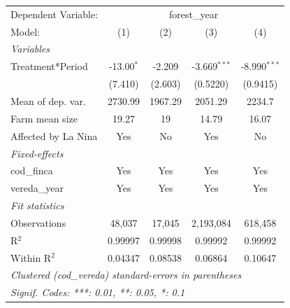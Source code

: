 
\begingroup
\centering
\begin{tabular}{lcccc}
   \tabularnewline \midrule \midrule
   Dependent Variable: & \multicolumn{4}{c}{forest\_year}\\
   Model:              & (1)          & (2)     & (3)            & (4)\\  
   \midrule
   \emph{Variables}\\
   Treatment*Period    & -13.00$^{*}$ & -2.209  & -3.669$^{***}$ & -8.990$^{***}$\\   
                       & (7.410)      & (2.603) & (0.5220)       & (0.9415)\\   
   Mean of dep. var.   & 2730.99      & 1967.29 & 2051.29        & 2234.7\\  
   Farm mean size      & 19.27        & 19      & 14.79          & 16.07\\  
   Affected by La Nina & Yes          & No      & Yes            & No\\  
   \midrule
   \emph{Fixed-effects}\\
   cod\_finca          & Yes          & Yes     & Yes            & Yes\\  
   vereda\_year        & Yes          & Yes     & Yes            & Yes\\  
   \midrule
   \emph{Fit statistics}\\
   Observations        & 48,037       & 17,045  & 2,193,084      & 618,458\\  
   R$^2$               & 0.99997      & 0.99998 & 0.99992        & 0.99992\\  
   Within R$^2$        & 0.04347      & 0.08538 & 0.06864        & 0.10647\\  
   \midrule \midrule
   \multicolumn{5}{l}{\emph{Clustered (cod\_vereda) standard-errors in parentheses}}\\
   \multicolumn{5}{l}{\emph{Signif. Codes: ***: 0.01, **: 0.05, *: 0.1}}\\
\end{tabular}
\par\endgroup


